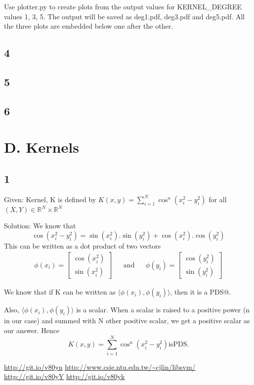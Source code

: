 \documentclass{article}
\begin{document}
Use plotter.py\cite{plotterpy} to create plots from the output values for KERNEL\_DEGREE values 1, 3, 5.  The output will be saved as deg1.pdf, deg3.pdf and deg5.pdf.  All the three plots are embedded below one after the other.



\subsection*{4}
\subsection*{5}
\subsection*{6}

\section*{D. Kernels}
\subsection*{1}
\begin{description}
  \item{Given:} Kernel, K is defined by \(K(x,y) = \sum_{i=1}^{N} \cos^{n} (x_{i}^{2} - y_{i}^{2} )\) for all \((X, Y) \in \mathbb{R}^{N} \times \mathbb{R}^{N} \) 
  \item{Solution:}  We know that
    \begin{equation}
      \cos (x_{i}^{2} - y_{i}^{2}) = \sin (x_{i}^{2}).\sin (y_{i}^{2}) + \cos (x_{i}^{2}).\cos (y_{i}^{2})
    \end{equation}
    This can be written as a dot product of two vectors 
    \begin{align}
    \phi(x_{i}) = \begin{bmatrix} \cos (x_{i}^{2}) \\ \sin (x_{i}^{2}) \end{bmatrix} && \mathrm{and} &&
    \phi(y_{i}) = \begin{bmatrix} \cos (y_{i}^{2}) \\ \sin (y_{i}^{2}) \end{bmatrix}
    \end{align}

    We know that if K can be written as \( \langle \phi(x_{i}), \phi(y_{i}) \rangle \), then it is a PDS@.

    Also, \( \langle \phi(x_{i}), \phi(y_{i}) \rangle \) is a scalar.  When a scalar is raised to a positive power (n in our case) and summed with N other positive scalar, we get a positive scalar as our answer.  Hence
    \begin{equation*}
      K(x,y) = \sum_{i=1}^{N} \cos^{n} (x_{i}^{2} - y_{i}^{2} ) \mathrm{is PDS.}
    \end{equation*}
\end{description}

\begin{thebibliography}{1}
   \url{http://git.io/v80yn}
   \url{http://www.csie.ntu.edu.tw/~cjlin/libsvm/}
   \url{http://git.io/v80yY}
   \url{http://git.io/v80yk}
\end{thebibliography}
\end{document}

